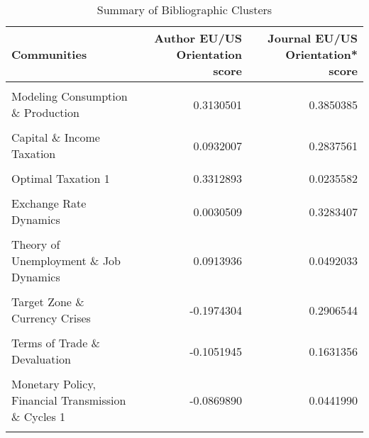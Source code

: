 \documentclass[
  12pt,
  onecolumn]{article}
\begin{document}
\begin{table}[!h]

\caption{\label{tab:summary-communities}Summary of Bibliographic Clusters}
\centering
\fontsize{9}{11}\selectfont
\begin{tabular}[t]{lrr}
\toprule
Communities & Author EU/US Orientation score & Journal EU/US Orientation* score\\
\midrule
\cellcolor{gray!6}{Disequilibrium \& Keynesian Macro} & \cellcolor{gray!6}{0.3597089} & \cellcolor{gray!6}{0.3604811}\\
Modeling Consumption \& Production & 0.3130501 & 0.3850385\\
\cellcolor{gray!6}{International Macroeconomics \& Target Zone} & \cellcolor{gray!6}{0.0574740} & \cellcolor{gray!6}{0.4805425}\\
Capital \& Income Taxation & 0.0932007 & 0.2837561\\
\cellcolor{gray!6}{Political Economics of Central Banks} & \cellcolor{gray!6}{0.2030799} & \cellcolor{gray!6}{0.1570998}\\
\addlinespace
Optimal Taxation 1 & 0.3312893 & 0.0235582\\
\cellcolor{gray!6}{Taxation, Tobin's Q \& Monetarism} & \cellcolor{gray!6}{0.1501539} & \cellcolor{gray!6}{0.1891055}\\
Exchange Rate Dynamics & 0.0030509 & 0.3283407\\
\cellcolor{gray!6}{Business Cycles, Cointegration \& Trends} & \cellcolor{gray!6}{0.1502819} & \cellcolor{gray!6}{0.0486818}\\
Theory of Unemployment \& Job Dynamics & 0.0913936 & 0.0492033\\
\addlinespace
\cellcolor{gray!6}{Monetary Policy, Financial Transmission \& Cycles 2} & \cellcolor{gray!6}{0.0520755} & \cellcolor{gray!6}{0.0413168}\\
Target Zone \& Currency Crises & -0.1974304 & 0.2906544\\
\cellcolor{gray!6}{Coordination \& Sunspots 2} & \cellcolor{gray!6}{0.1473730} & \cellcolor{gray!6}{-0.0577712}\\
Terms of Trade \& Devaluation & -0.1051945 & 0.1631356\\
\cellcolor{gray!6}{Taxation, Debt \& Growth} & \cellcolor{gray!6}{-0.0963509} & \cellcolor{gray!6}{0.1046673}\\
\addlinespace
Monetary Policy, Financial Transmission \& Cycles 1 & -0.0869890 & 0.0441990\\
\cellcolor{gray!6}{Optimal Taxation 2} & \cellcolor{gray!6}{0.2672668} & \cellcolor{gray!6}{-0.3252071}\\

\end{tabular}
\end{table}
\end{document}
